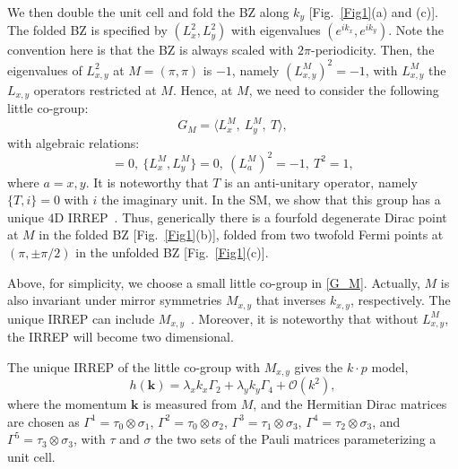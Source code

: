 \documentclass[aps,prl,twocolumn,noshowpacs,superscriptaddress]{revtex4-1}
\def \K {\hat{\mathcal{K}}}
\def \Z {\mathbb{Z}}
\def \k {\bm{k}}
\begin{document}
We then double the unit cell  and fold the BZ along $k_y$ [Fig.~\ref{Fig1}(a) and (c)]. The folded BZ is specified by $(L_x^2,L_y^2)$ with eigenvalues $(e^{ik_x},e^{ik_y})$. Note the convention here is that the BZ is always scaled with $2\pi$-periodicity.
Then, the eigenvalues of $L_{x,y}^2$ at $M=(\pi,\pi)$ is $-1$, namely $(L_{x,y}^M)^2=-1$, with $L_{x,y}^M$ the $L_{x,y}$ operators restricted  at $M$.
Hence, at $M$, we need to consider the following little co-group:
\begin{equation}\label{G_M}
	G_M=\langle L_x^M,~L_y^M,~T\rangle,
\end{equation}
with algebraic relations:
\begin{equation}
[T,L_{a}^M]=0,~\{L_x^M,L_y^M\}=0,~(L_{a}^M)^2=-1,~T^2=1,
\end{equation}
where $a=x,y$. It is noteworthy that $T$ is an anti-unitary operator, namely $\{T,i\}=0$ with $i$ the imaginary unit. In the SM, we show that this group has a unique $4$D IRREP~\cite{SM}. Thus, generically there is a fourfold degenerate Dirac point at $M$ in the folded BZ [Fig.~\ref{Fig1}(b)], folded from two twofold Fermi points  at $(\pi,\pm\pi/2)$ in the unfolded BZ [Fig.~\ref{Fig1}(c)].

Above, for simplicity, we choose a small little co-group in \eqref{G_M}. Actually, $M$ is also invariant under mirror symmetries $M_{x,y}$ that inverses $k_{x,y}$, respectively. The unique IRREP can include $M_{x,y}$~\cite{SM}. Moreover, it is noteworthy that without $L_{x,y}^M$, the IRREP will become two dimensional.

The unique IRREP of the little co-group with $M_{x,y}$ gives the $k\cdot p$ model,
\begin{equation}\label{Rectangular_kp}
	h(\bm{k})=\lambda_x k_x \Gamma_2+\lambda_y k_y\Gamma_4 +\mathcal{O}(k^2),
\end{equation}
where the momentum $\bm k$ is measured from $M$, and the Hermitian Dirac matrices are chosen as $\Gamma^1=\tau_0\otimes\sigma_1$, $\Gamma^2=\tau_0\otimes\sigma_2$, $\Gamma^3=\tau_1\otimes\sigma_3$, $\Gamma^4=\tau_2\otimes\sigma_3$, and $\Gamma^5=\tau_3\otimes\sigma_3$, with $\tau$ and $\sigma$ the two sets of the Pauli matrices parameterizing a unit cell.

\end{document}
